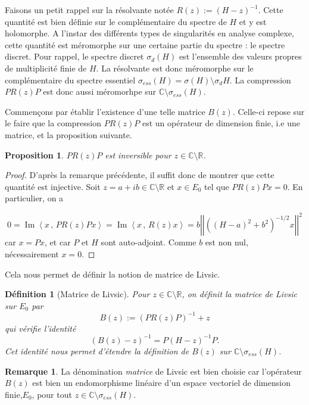 \documentclass[12pt,openany,a4paper, titlepage]{article}
\newcommand{\lp}{\left(}
\newcommand{\rp}{\right)}
\newcommand{\lb}{\left|}
\newcommand{\rb}{\right|}
\newcommand{\la}{\left\langle}
\newcommand{\ra}{\right\rangle}
\newcommand{\R}{\mathbb{R}}
\newcommand{\C}{\mathbb{C}}
\newcommand{\inv}{^{-1}}
\newcommand{\im}{\operatorname{Im}}
\newtheorem{Def}{Définition}
\newtheorem{prop}{Proposition}
\theoremstyle{definition}
\theoremstyle{definition}
\theoremstyle{definition}
\theoremstyle{definition}
\theoremstyle{definition}
\newtheorem{rem}{Remarque}
\theoremstyle{definition}
\begin{document}
Faisons un petit rappel sur la résolvante notée $R(z) := (H-z)\inv$. Cette quantité est bien définie sur le complémentaire du spectre de $H$ et y est holomorphe. A l'instar des différents types de singularités en analyse complexe, cette quantité est méromorphe sur une certaine partie du spectre : le spectre discret. Pour rappel, le spectre discret $\sigma_d(H)$ est l'ensemble des valeurs propres de multiplicité finie de $H$. La résolvante est donc méromorphe sur le complémentaire du spectre essentiel $\sigma_{ess}(H) = \sigma(H)\setminus\sigma_d H$. La compression $PR(z)P$ est donc aussi méromorhpe sur  $\C\setminus\sigma_{ess}(H)$.

Commençons par établir l'existence d'une telle matrice $B(z)$. Celle-ci repose sur le faire que la compression $PR(z)P$ est un opérateur de dimension finie, i.e une matrice, et la proposition suivante.

\begin{prop}
    $PR(z)P$ est inversible pour $z\in\C\setminus\R$.
\end{prop}
\begin{proof}
    D'après la remarque précédente, il suffit donc de montrer que cette quantité est injective. Soit $z = a+ib\in\C\setminus\R$ et $x\in E_0$ tel que $PR(z)Px = 0$. En particulier, on a 

    $$0 = \im\la x\,,\, PR(z)Px \ra = \im\la x\,,\, R(z)x \ra = b\lb\lb\lp (H-a)^2 + b^2 \rp^{-1/2}x\rb\rb^2$$
    car $x = Px$, et car $P$ et $H$ sont auto-adjoint. Comme $b$ est non nul, nécessairement $x = 0$.
\end{proof}

Cela nous permet de définir la notion de matrice de Livsic.

\begin{Def}[Matrice de Livsic]
Pour $z\in \C\setminus\R$, on définit la matrice de Livsic sur $E_0$ par
\begin{equation*}
    B(z) := (PR(z)P)\inv + z
\end{equation*}
qui vérifie l'identité 
\begin{equation*}
    (B(z)-z)\inv = P(H-z)\inv P.
\end{equation*}
Cet identité nous permet d'étendre la définition de $B(z)$ sur $\C\setminus\sigma_{ess}(H)$.
\end{Def}

\begin{rem}
    La dénomination \textit{matrice} de Livsic est bien choisie car l'opérateur $B(z)$ est bien un endomorphisme linéaire d'un espace vectoriel de dimension finie,$E_0$, pour tout $z\in\C\setminus\sigma_{ess}(H)$.
\end{rem}
\end{document}
